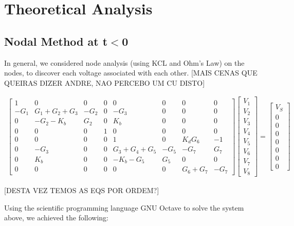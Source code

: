 \section{Theoretical Analysis} \label{sec:analysis}

\subsection{Nodal Method at t$<$0}

In general, we considered node analysis (using KCL and Ohm's Law) on the nodes, to discover each voltage associated with each other.
[MAIS CENAS QUE QUEIRAS DIZER ANDRE, NAO PERCEBO UM CU DISTO]

\begin{gather}
\begin{bmatrix}
1 & 0 & 0 & 0 & 0 & 0 & 0 & 0\\
-G_1 & G_1+G_2+G_3 & -G_2& 0 & -G_3 & 0 & 0 & 0\\
0 & -G_2-K_b & G_2 & 0 & K_b & 0 & 0 & 0\\
0 & 0 & 0 & 1 & 0 & 0 & 0 & 0\\
0 & 0 & 0 & 0 & 1 & 0 & K_d G_6 & -1\\
0 & -G_3 & 0 & 0 & G_3+G_4+G_5 & -G_5 & -G_7 & G_7\\
0 & K_b & 0 & 0 & -K_b-G_5 & G_5 & 0 & 0\\
0 & 0 & 0 & 0 & 0 & 0 & G_6+G_7 & -G_7
\end{bmatrix}
\begin{bmatrix}
 V_1\\
 V_2\\
 V_3\\
 V_4\\
 V_5\\
 V_6\\
 V_7\\
 V_8
\end{bmatrix}
=
\begin{bmatrix}
 V_S\\
 0\\
 0\\
 0\\
 0\\
 0\\
 0\\
 0
\end{bmatrix}
\end{gather}

[DESTA VEZ TEMOS AS EQS POR ORDEM?]

Using the scientific programming language GNU Octave to solve the system above, we achieved the following:






